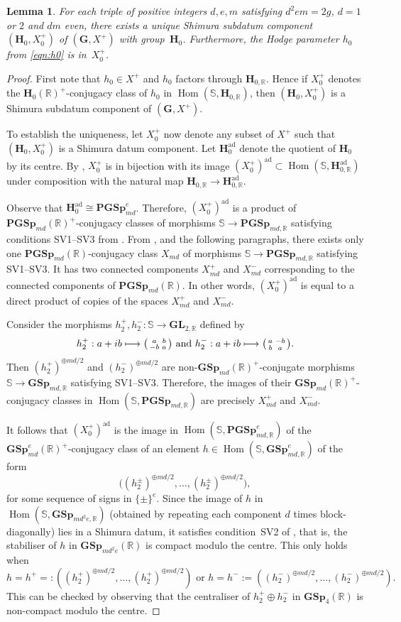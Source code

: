 \documentclass[JEP,XML,SOM,Unicode,NoFloatCountersInSection]{cedram}
\def\mto{\mathchoice{\longmapsto}{\mapsto}{\mapsto}{\mapsto}}
\newcommand{\bR}{\mathbb{R}}
\newcommand{\bS}{\mathbb{S}}
\newcommand{\gG}{\mathbf{G}}
\newcommand{\gGL}{\mathbf{GL}}
\newcommand{\gGSp}{\mathbf{GSp}}
\newcommand{\gPGSp}{\mathbf{PGSp}}
\newcommand{\gH}{\mathbf{H}}
\DeclareMathOperator{\Hom}{Hom}
\newcommand{\ad}{\mathrm{ad}}
\newcommand{\fullsmallmatrix}[4]{\bigl( \begin{smallmatrix} #1 & #2 \\ #3 & #4 \end{smallmatrix} \bigr)}
\newtheorem{lemma}{Lemma}[section]
\begin{document}
\begin{lemma}\label{unique-datum}
For each triple of positive integers $d,e,m$ satisfying $d^2em=2g$, $d=1$ or $2$ and $dm$ even, there exists a unique Shimura subdatum component $(\gH_0,X^+_0)$ of $(\gG,X^+)$ with group~$\gH_0$. Furthermore, the Hodge parameter $h_0$ from \eqref{eqn:h0} is in~$X_0^+$.
\end{lemma}

\begin{proof}
First note that $h_0 \in X^+$ and $h_0$ factors through $\gH_{0,\bR}$.
Hence if $X_0^+$ denotes the $\gH_0(\bR)^+$-conjugacy class of $h_0$ in $\Hom(\bS, \gH_{0,\bR})$, then $(\gH_0, X_0^+)$ is a Shimura subdatum component of $(\gG, X^+)$.

To establish the uniqueness, let $X_0^+$ now denote any subset of $X^+$ such that $(\gH_0, X_0^+)$ is a Shimura datum component.
Let $\gH_0^\ad$ denote the quotient of $\gH_0$ by its centre.
By \cite[Prop.\,5.7(a)]{Mil05}, $X_0^+$ is in bijection with its image $(X^+_0)^{\ad}\subset\Hom(\mathbb{S},\gH^\ad_{0,\bR})$ under composition with the natural map $\gH_{0,\bR}\to\gH^{\ad}_{0,\bR}$.

Observe that $\gH^\ad_0\cong\gPGSp_{md}^e$. Therefore, $(X^+_0)^{\ad}$ is a product of $\gPGSp_{md}(\bR)^+$-conjugacy classes of morphisms $\mathbb{S}\to\gPGSp_{md,\bR}$ satisfying conditions SV1--SV3 from \cite[\S 4]{Mil05}. From \cite[Prop 1.24]{Mil05}, and the following paragraphs, there exists only one $\gPGSp_{md}(\bR)$-conjugacy class $X_{md}$ of morphisms $\mathbb{S}\to\gPGSp_{md,\bR}$ satisfying SV1--SV3. It has two connected components $X^+_{md}$ and $X^-_{md}$ corresponding to the connected components of $\gPGSp_{md}(\bR)$. In other words, $(X^+_0)^{\ad}$ is equal to a direct product of copies of the spaces $X^+_{md}$ and $X^-_{md}$.

Consider the morphisms $h^+_2,h^-_2:\mathbb{S}\to\gGL_{2,\bR}$ defined by
\[h^+_2:a+ib\mto\fullsmallmatrix{a}{b}{-b}{a}\text{ and } h^-_2:a+ib\mto\fullsmallmatrix{a}{-b}{b}{a}.\]
Then $(h^+_2)^{\oplus md/2}$ and $(h^-_2)^{\oplus md/2}$ are non-$\gGSp_{md}(\bR)^+$-conjugate morphisms $\mathbb{S}\to\gGSp_{md,\bR}$ satisfying SV1--SV3. Therefore, the images of their $\gGSp_{md}(\bR)^+$-conjugacy classes in $\Hom(\mathbb{S},\gPGSp_{md,\bR})$ are precisely $X^+_{md}$ and $X^-_{md}$.

It follows that $(X^+_0)^{\ad}$ is the image in $\Hom(\mathbb{S},\gPGSp^e_{md,\bR})$ of the $\gGSp_{md}^e(\bR)^+$-conjugacy class of an element $h\in\Hom(\mathbb{S},\gGSp^e_{md,\bR})$ of the form
\[\bigl( (h^{\pm}_2)^{\oplus md/2}, \dotsc, (h^{\pm}_2)^{\oplus md/2} \bigr),\]
for some sequence of signs in $\{\pm\}^e$.
Since the image of $h$ in $\Hom(\mathbb{S},\gGSp_{md^2e,\bR})$ (obtained by repeating each component $d$ times block-diagonally) lies in a Shimura datum, it satisfies condition~SV2 of \cite{Mil05}, that is, the stabiliser of $h$ in $\gGSp_{md^2e}(\bR)$ is compact modulo the centre. This only holds when
\[
h=h^+=:((h^+_2)^{\oplus md/2}, \dotsc, (h^+_2)^{\oplus md/2}) \text{ or } h=h^-:=((h^-_2)^{\oplus md/2}, \dotsc, (h^-_2)^{\oplus md/2}).\]
This can be checked by observing that the centraliser of $h^+_2 \oplus h^-_2$ in $\gGSp_4(\bR)$ is non-compact modulo the centre.


\end{proof}
\end{document}
